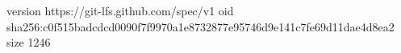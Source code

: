 version https://git-lfs.github.com/spec/v1
oid sha256:c0f515badcdcd0090f7f9970a1e8732877e95746d9e141c7fe69d11dae4d8ea2
size 1246
